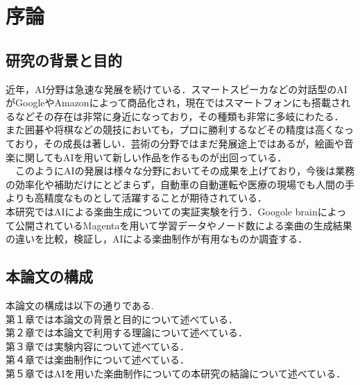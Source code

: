 \chapter{序論}
\section{研究の背景と目的}
近年，AI分野は急速な発展を続けている．スマートスピーカなどの対話型のAIがGoogleやAmazonによって商品化され，現在ではスマートフォンにも搭載されるなどその存在は非常に身近になっており，その種類も非常に多岐にわたる．\\
また囲碁や将棋などの競技においても，プロに勝利するなどその精度は高くなっており，その成長は著しい．芸術の分野ではまだ発展途上ではあるが，絵画や音楽に関してもAIを用いて新しい作品を作るものが出回っている．\\
　このようにAIの発展は様々な分野においてその成果を上げており，今後は業務の効率化や補助だけにとどまらず，自動車の自動運転や医療の現場でも人間の手よりも高精度なものとして活躍することが期待されている．\\
本研究ではAIによる楽曲生成についての実証実験を行う．Googole brainによって公開されているMagentaを用いて学習データやノード数による楽曲の生成結果の違いを比較，検証し，AIによる楽曲制作が有用なものか調査する．\\



\section{本論文の構成}
本論文の構成は以下の通りである.\\
第１章では本論文の背景と目的について述べている．\\
第２章では本論文で利用する理論について述べている．\\
第３章では実験内容について述べている．\\
第４章では楽曲制作について述べている．\\
第５章ではAIを用いた楽曲制作についての本研究の結論について述べている．\\
